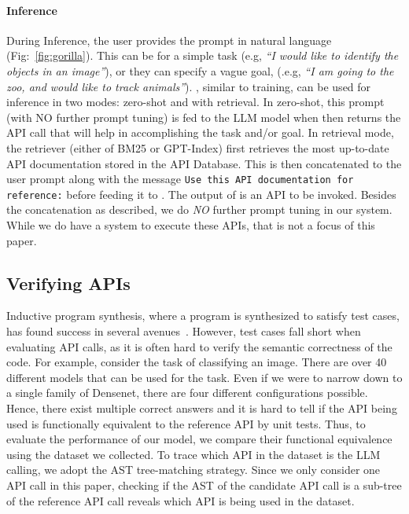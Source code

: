 \paragraph{\oursmethod{} Inference} During Inference, the user provides the prompt in natural language (Fig:~\ref{fig:gorilla}). This can be for a simple task (e.g, \emph{``I would like to identify the objects in an image''}), or they can specify a vague goal, (.e.g, \emph{``I am going to the zoo, and would like to track animals''}). \gorilla{}, similar to training, can be used for inference in two modes: zero-shot and with retrieval. In zero-shot, this prompt (with NO further prompt tuning) is fed to the \gorilla{} LLM model when then returns the API call that will help in accomplishing the task and/or goal. In retrieval mode, the retriever (either of BM25 or GPT-Index) first retrieves the most up-to-date API documentation stored in the API Database. This is then concatenated to the user prompt along with the message \texttt{Use this API documentation for reference:} before feeding it to \gorilla{}.  The output of \gorilla{} is an API to be invoked. Besides the concatenation as described, we do \emph{NO} further prompt tuning in our system. While we do have a system to execute these APIs, that is not a focus of this paper. 


\subsection{Verifying APIs}

Inductive program synthesis, where a program is synthesized to satisfy test cases, has found success in several avenues~\cite{autopandas, flashfill}. 
However, test cases fall short when evaluating API calls, as it is often hard to verify the semantic correctness of the code. For example, consider the task of classifying an image. 
There are over 40 different models that can be used for the task. Even if we were to narrow down to a single family of Densenet, there are four different configurations possible. Hence, there exist multiple correct answers and it is hard to tell if the API being used is functionally equivalent to the reference API by unit tests. Thus, to evaluate the performance of our model, we compare their functional equivalence using the dataset we collected. To trace which API in the dataset is the LLM calling, we adopt the AST tree-matching strategy. Since we only consider one API call in this paper, checking if the AST of the candidate API call is a sub-tree of the reference API call reveals which API is being used in the dataset. 


